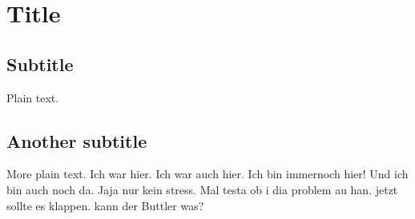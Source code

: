 \documentclass{article}
\begin{document}
\section{Title}

\subsection{Subtitle}

Plain text.

\subsection{Another subtitle}

More plain text.
Ich war hier.
Ich war auch hier.
Ich bin immernoch hier!
Und ich bin auch noch da.
Jaja nur kein stress.
Mal testa ob i dia problem au han.
jetzt sollte es klappen.
kann der Buttler was?
\end{document}
